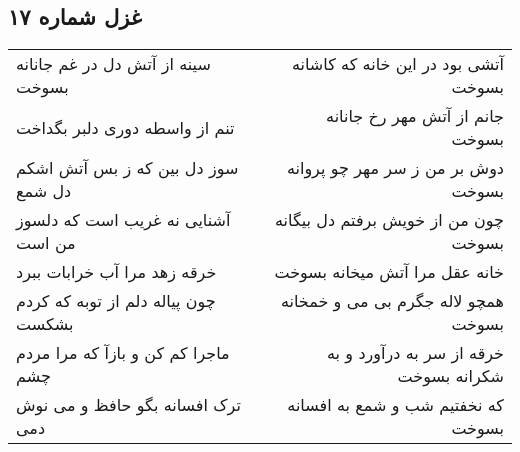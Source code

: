 \begin{center}
\section*{غزل شماره ۱۷}
\label{sec:sh017}
\begin{longtable}{l p{0.5cm} r}
سینه از آتش دل در غم جانانه بسوخت
&&
آتشی بود در این خانه که کاشانه بسوخت
\\
تنم از واسطه دوری دلبر بگداخت
&&
جانم از آتش مهر رخ جانانه بسوخت
\\
سوز دل بین که ز بس آتش اشکم دل شمع
&&
دوش بر من ز سر مهر چو پروانه بسوخت
\\
آشنایی نه غریب است که دلسوز من است
&&
چون من از خویش برفتم دل بیگانه بسوخت
\\
خرقه زهد مرا آب خرابات ببرد
&&
خانه عقل مرا آتش میخانه بسوخت
\\
چون پیاله دلم از توبه که کردم بشکست
&&
همچو لاله جگرم بی می و خمخانه بسوخت
\\
ماجرا کم کن و بازآ که مرا مردم چشم
&&
خرقه از سر به درآورد و به شکرانه بسوخت
\\
ترک افسانه بگو حافظ و می نوش دمی
&&
که نخفتیم شب و شمع به افسانه بسوخت
\\
\end{longtable}
\end{center}
